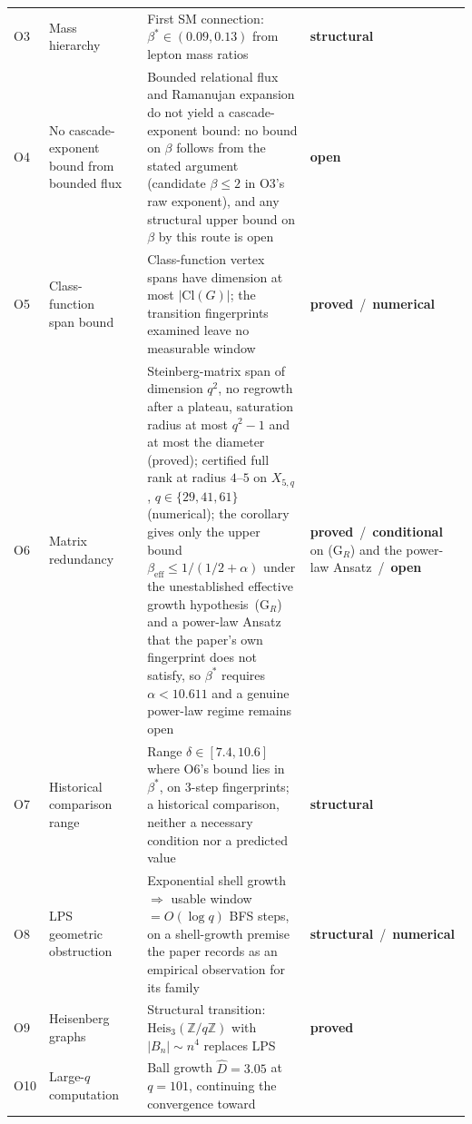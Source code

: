 \documentclass[11pt,a4paper]{article}
\newcommand{\Heis}{\mathrm{Heis}}
\newcommand{\sproved}{\textcolor{cproved}{\textbf{proved}}}
\newcommand{\sstruct}{\textcolor{cstruct}{\textbf{structural}}}
\newcommand{\sopen}{\textcolor{copen}{\textbf{open}}}
\newcommand{\snum}{\textcolor{cnum}{\textbf{numerical}}}
\newcommand{\scond}{\textcolor{ccond}{\textbf{conditional}}}
\begin{document}
\begin{longtable}{@{}p{1.70cm}p{2.9cm}p{1.3cm}p{6.25cm}>{\raggedright\arraybackslash}p{2.0cm}@{}}
      O3 & Mass hierarchy & \cite{Beau2026a7} &
      First SM connection: $\beta^* \in (0.09, 0.13)$ from lepton mass ratios &
      \sstruct \\[3pt]
      O4 & No cascade-exponent bound from bounded flux & \cite{Beau2026a8} &
      Bounded relational flux and Ramanujan expansion do not yield a cascade-exponent bound:
      no bound on $\beta$ follows from the stated argument (candidate $\beta \leq 2$ in O3's raw exponent),
      and any structural upper bound on $\beta$ by this route is open &
      \sopen \\[3pt]
      O5 & Class-function span bound & \cite{Beau2026a9} &
      Class-function vertex spans have dimension at most $|\mathrm{Cl}(G)|$; the transition
      fingerprints examined leave no measurable window &
      \sproved\ /\ \snum \\[3pt]
      O6 & Matrix redundancy & \cite{Beau2026a10} &
      Steinberg-matrix span of dimension $q^2$, no regrowth after a plateau, saturation radius at
      most $q^2-1$ and at most the diameter (proved); certified full rank at radius $4$--$5$ on
      $X_{5,q}$, $q \in \{29,41,61\}$ (numerical); the corollary gives only the upper bound $\beta_{\mathrm{eff}} \le 1/(1/2+\alpha)$ under the unestablished
      effective growth hypothesis~(G$_R$) and a power-law Ansatz that the paper's own fingerprint does not
      satisfy, so $\beta^*$ requires $\alpha < 10.611$ and a genuine power-law regime remains open &
      \sproved\ /\ \scond{} on (G$_R$) and the power-law Ansatz\ /\ \sopen \\[3pt]
      O7 & Historical comparison range & \cite{Beau2026a11} &
      Range $\delta \in [7.4, 10.6]$ where O6's bound lies in $\beta^*$, on 3-step fingerprints; a
      historical comparison, neither a necessary condition nor a predicted value &
      \sstruct \\[3pt]
      O8 & LPS geometric obstruction & \cite{Beau2026a12} &
      Exponential shell growth $\Rightarrow$ usable window $= O(\log q)$ BFS steps, on a shell-growth
      premise the paper records as an empirical observation for its family &
      \sstruct\ /\ \snum \\[3pt]
      \midrule
      O9 & Heisenberg graphs & \cite{Beau2026a13} &
      Structural transition: $\Heis_3(\mathbb{Z}/q\mathbb{Z})$ with $|B_n| \sim n^4$ replaces LPS &
      \sproved \\[3pt]
      O10 & Large-$q$ computation & \cite{Beau2026a14} &
      Ball growth $\hat D = 3.05$ at $q=101$, continuing the convergence toward

\end{longtable}
\end{document}
